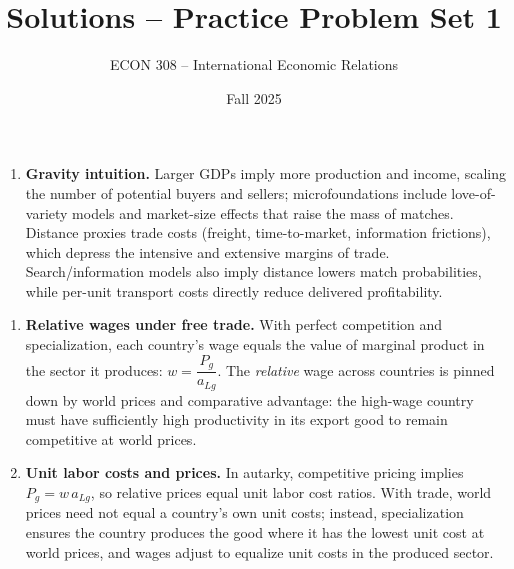 \documentclass[11pt]{article}
\title{Solutions -- Practice Problem Set 1}
\author{ECON 308 -- International Economic Relations}
\date{Fall 2025}
\begin{document}
\maketitle



\begin{enumerate}[leftmargin=*]
\item \textbf{Gravity intuition.} Larger GDPs imply more production and income, scaling the number of potential buyers and sellers; microfoundations include love-of-variety models and market-size effects that raise the mass of matches. Distance proxies trade costs (freight, time-to-market, information frictions), which depress the intensive and extensive margins of trade. Search/information models also imply distance lowers match probabilities, while per-unit transport costs directly reduce delivered profitability.





\end{enumerate}




\begin{enumerate}[leftmargin=*,resume]

\item \textbf{Relative wages under free trade.} With perfect competition and specialization, each country's wage equals the value of marginal product in the sector it produces: $w=\dfrac{P_g}{a_{Lg}}$. The \emph{relative} wage across countries is pinned down by world prices and comparative advantage: the high-wage country must have sufficiently high productivity in its export good to remain competitive at world prices.


\item \textbf{Unit labor costs and prices.} In autarky, competitive pricing implies $P_g=w\,a_{Lg}$, so relative prices equal unit labor cost ratios. With trade, world prices need not equal a country's own unit costs; instead, specialization ensures the country produces the good where it has the lowest unit cost at world prices, and wages adjust to equalize unit costs in the produced sector.
\end{enumerate}
\end{document}

